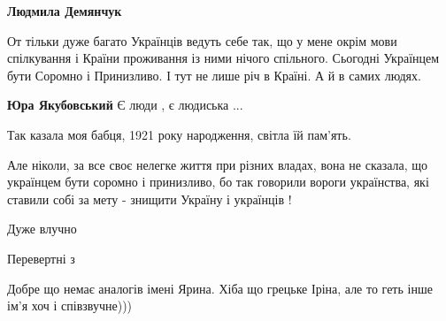 \begin{itemize}
\begin{itemize}
 
\textbf{Людмила Демянчук} 

От тільки дуже багато Українців ведуть себе так, що у мене окрім мови
спілкування і Країни проживання із ними нічого спільного. Сьогодні Українцем
бути Соромно і Принизливо. І тут не лише річ в Країні. А й в самих людях.

 
\textbf{Юра Якубовський}
Є люди , є людиська ...

Так казала моя бабця, 1921 року народження, світла їй пам'ять.

Але ніколи, за все своє нелегке життя при різних владах, вона не сказала, що
українцем бути соромно і принизливо, бо так говорили вороги українства, які
ставили собі за мету - знищити Україну і українців !

\end{itemize}

 
Дуже влучно

 
Перевертні з

 
Добре що немає аналогів імені Ярина. Хіба що грецьке Іріна, але то геть інше ім'я хоч і співзвучне)))


\end{itemize}
